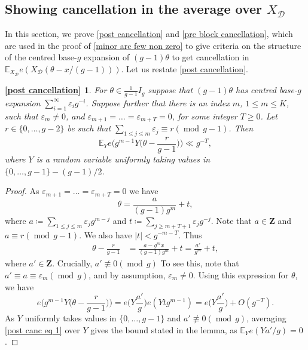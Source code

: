 \documentclass[hidelinks,11pt,reqno]{amsart}
\renewcommand{\leq}{\leqslant}
\renewcommand{\geq}{\geqslant}
\newcommand{\Z}{\ensuremath{\mathbf{Z}}}
\newcommand{\E}{\ensuremath{\mathbb{E}}}
\newcommand{\xbd}{X_{\mathcal{D}}}
\newcommand{\nequiv}{\not\equiv}
\newtheorem*{post-canc-rpt}{\cref{post cancellation}}
\theoremstyle{remark}
\newcommand{\md}[1]{\ensuremath{(\operatorname{mod}\, #1)}}
\begin{document}
\subsection{Showing cancellation in the average over $\xbd$}\label{section d cancellation}
In this section, we prove \cref{post cancellation} and \cref{pre block cancellation}, which are used in the proof of \cref{minor arc few non zero} to give criteria on the structure of the centred base-$g$ expansion of $(g-1)\theta$ to get cancellation in $\E_{\xbd}e(\xbd(\theta-x/(g-1))).$ Let us restate \cref{post cancellation}.
\begin{post-canc-rpt}
  For $\theta\in \tfrac{1}{g-1}I_{g}$ suppose that $(g-1)\theta$ has centred base-$g$ expansion $\sum_{i=1}^{\infty}\varepsilon_{i}g^{-i}$. Suppose further that there is an index $m$, $1\leq m\leq K$, such that $\varepsilon_{m}\neq 0$, and $\varepsilon_{m+1}=\ldots= \varepsilon_{m+T}=0$, for some integer $T\geq 0$. Let $r\in \{0,\ldots, g-2\}$ be such that $\sum_{1\leq j \leq m}\varepsilon_{j}\equiv r\md{g-1}$. Then \[\E_{Y}e\Big(g^{m-1}Y\Big (\theta-\frac{r}{g-1}\Big)\Big)\ll g^{-T},\]
       where $Y$ is a random variable uniformly taking values in $\{0,\ldots, g-1\}-(g-1)/2$.
        \end{post-canc-rpt}
\begin{proof}
As $\varepsilon_{m+1}=\ldots=\varepsilon_{m+T}=0$ we have
    \begin{equation}\label{post canc theta structure}
        \theta=\frac{a}{(g-1)g^{m}}+t,
    \end{equation}
    where $a\coloneq \sum_{1\leq j\leq m}\varepsilon_{j}g^{m-j}$ and $t\coloneq\sum_{j\geq m+T+1}\varepsilon_{j}g^{-j}$. Note that $a\in \Z$ and $a\equiv r \md{g-1}$. We also have $|t|<g^{-m-T}$. Thus 
    \begin{align*}
        \theta-\frac{r}{g-1}&=\frac{a-g^{m}x}{(g-1)g^{m}}+t=\frac{a'}{g^{m}}+t,
    \end{align*}
    where $a'\in \Z$. Crucially, $a'\nequiv 0 \md{g}$ To see this, note that $a'\equiv a \equiv \varepsilon_{m}\md{g}$, and by assumption, $\varepsilon_{m}\neq 0$. Using this expression for $\theta$, we have
    \begin{equation}\label{post canc eq 1}
        e\Big(g^{m-1}Y\Big(\theta-\frac{r}{g-1}\Big)\Big)=e\Big(Y\frac{a'}{g}\Big)e(Ytg^{m-1})=e\Big(Y\frac{a'}{g}\Big)+O(g^{-T}).
    \end{equation}
   As $Y$ uniformly takes values in $\{0,\ldots, g-1\}$ and $a'\nequiv 0 \md{g}$, averaging \cref{post canc eq 1} over $Y$ gives the bound stated in the lemma, as $\E_{Y}e(Ya'/g)=0$.
\end{proof}
\end{document}
